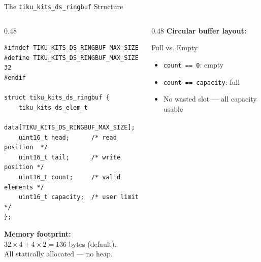 \documentclass[aspectratio=169, 10pt]{beamer}
\begin{document}
\begin{frame}[fragile]{The \texttt{tiku\_kits\_ds\_ringbuf} Structure}
\begin{columns}[T]
\begin{column}{0.48\textwidth}
\begin{lstlisting}[style=cstyle,
  title={ds/ringbuf/tiku\_kits\_ds\_ringbuf.h}]
#ifndef TIKU_KITS_DS_RINGBUF_MAX_SIZE
#define TIKU_KITS_DS_RINGBUF_MAX_SIZE 32
#endif

struct tiku_kits_ds_ringbuf {
    tiku_kits_ds_elem_t
        data[TIKU_KITS_DS_RINGBUF_MAX_SIZE];
    uint16_t head;      /* read position  */
    uint16_t tail;      /* write position */
    uint16_t count;     /* valid elements */
    uint16_t capacity;  /* user limit     */
};
\end{lstlisting}

\vspace{0.3em}
\textbf{Memory footprint:}\\
$32 \times 4 + 4 \times 2 = 136$ bytes (default).\\
All statically allocated --- no heap.
\end{column}

\begin{column}{0.48\textwidth}
\textbf{Circular buffer layout:}
\begin{center}
\end{center}

\vspace{0.5em}
\begin{block}{Full vs. Empty}
\begin{itemize}
  \item \texttt{count == 0}: empty
  \item \texttt{count == capacity}: full
  \item No wasted slot --- all capacity usable
\end{itemize}
\end{block}
\end{column}
\end{columns}
\end{frame}
\end{document}

